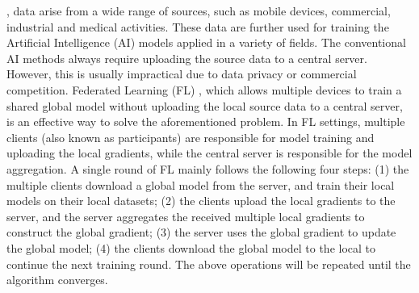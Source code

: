 \documentclass[10pt,journal,compsoc]{IEEEtran}
\begin{document}
, data arise from a wide range of sources, such as mobile devices, commercial, industrial and medical activities. These data are further used for training the Artificial Intelligence (AI) models applied in a variety of fields. The conventional AI methods always require uploading the source data to a central server. However, this is usually impractical due to data privacy or commercial competition. Federated Learning (FL) \cite{konecny2017federated}, which allows multiple devices to train a shared global model without uploading the local source data to a central server, is an effective way to solve the aforementioned problem. In FL settings, multiple clients (also known as participants) are responsible for model training and uploading the local gradients, while the central server is responsible for the model aggregation. A single round of FL mainly follows the following four steps: (1) the multiple clients download a global model from the server, and train their local models on their local datasets; (2) the clients upload the local gradients to the server, and the server aggregates the received multiple local gradients to construct the global gradient; (3) the server uses the global gradient to update the global model; (4) the clients download the global model to the local to continue the next training round. The above operations will be repeated until the algorithm converges. %


\end{document}
